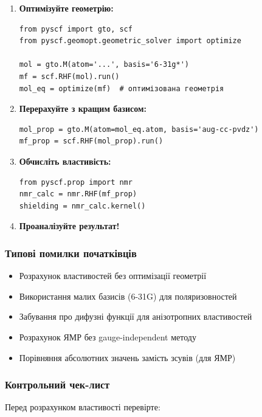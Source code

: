 \begin{enumerate}
    \item \textbf{Оптимізуйте геометрію:}
    \begin{verbatim}
from pyscf import gto, scf
from pyscf.geomopt.geometric_solver import optimize

mol = gto.M(atom='...', basis='6-31g*')
mf = scf.RHF(mol).run()
mol_eq = optimize(mf)  # оптимізована геометрія
    \end{verbatim}

    \item \textbf{Перерахуйте з кращим базисом:}
    \begin{verbatim}
mol_prop = gto.M(atom=mol_eq.atom, basis='aug-cc-pvdz')
mf_prop = scf.RHF(mol_prop).run()
    \end{verbatim}

    \item \textbf{Обчисліть властивість:}
    \begin{verbatim}
from pyscf.prop import nmr
nmr_calc = nmr.RHF(mf_prop)
shielding = nmr_calc.kernel()
    \end{verbatim}

    \item \textbf{Проаналізуйте результат!}
\end{enumerate}

\subsubsection*{Типові помилки початківців}

\begin{itemize}
    \item Розрахунок властивостей без оптимізації геометрії
    \item Використання малих базисів (6-31G) для поляризовностей
    \item Забування про дифузні функції для анізотропних властивостей
    \item Розрахунок ЯМР без gauge-independent методу
    \item Порівняння абсолютних значень замість зсувів (для ЯМР)
\end{itemize}

\subsubsection*{Контрольний чек-лист}

Перед розрахунком властивості перевірте:

